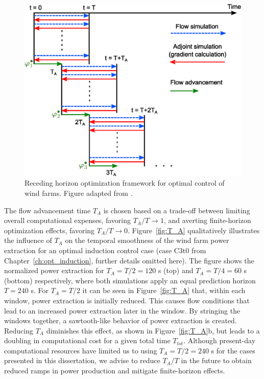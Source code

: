 \begin{figure}[]
	\centering
	\includegraphics[width=0.65\linewidth]{chapters/optimal_control_problem/figure2.eps}
	\caption{Receding horizon optimization framework for optimal control of wind farms. Figure adapted from \cite{goit2015optimal}.}
	\label{fig:drawing_receding_horizon}
\end{figure}

The flow advancement time $T_A$ is chosen based on a trade-off between limiting overall computational expenses, favoring $T_A/T \rightarrow 1$, and averting finite-horizon optimization effects, favoring $T_A/T \rightarrow 0$. Figure~\ref{fig:T_A} qualitatively illustrates the influence of $T_A$ on the temporal smoothness of the wind farm power extraction for an optimal induction control case (case C3t0 from Chapter~\ref{ch:opt_induction}, further details omitted here). The figure shows the normalized power extraction for $T_A = T/2 = 120$ s (top) and $T_A = T/4 = 60$ s (bottom) respectively, where both simulations apply an equal prediction horizon $T = 240$ s. For $T_A = T/2$ it can be seen in Figure~\ref{fig:T_A} that, within each window, power extraction is initially reduced. This causes flow conditions that lead to an increased power extraction later in the window. By stringing the windows together, a sawtooth-like behavior of power extraction is created. Reducing $T_A$ diminishes this effect, as shown in Figure~\ref{fig:T_A}b, but leads to a doubling in computational cost for a given total time $T_{tot}$. Although present-day computational resources have limited us to using $T_A = T/2 = 240$ s for the cases presented in this dissertation, we advise to reduce $T_A/T$ in the future to obtain reduced ramps in power production and mitigate finite-horizon effects.

